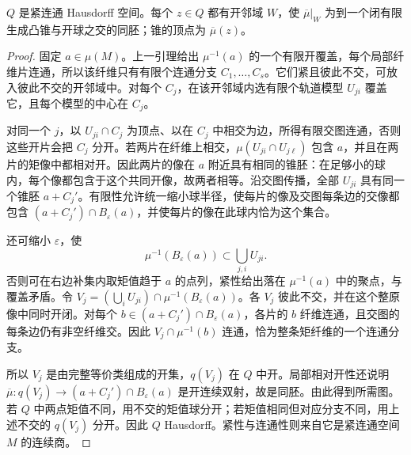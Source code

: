 \begin{lemma}\label{g4:lem:1202:fibre-component-quotient}
	\(Q\) 是紧连通 Hausdorff 空间。每个 \(z\in Q\) 都有开邻域 \(W\)，使 \(\overline\mu|_W\) 为到一个闭有限生成凸锥与开球之交的同胚；锥的顶点为 \(\overline\mu(z)\)。
\end{lemma}
\begin{proof}
	固定 \(a\in\mu(M)\)。上一引理给出 \(\mu^{-1}(a)\) 的一个有限开覆盖，每个局部纤维片连通，所以该纤维只有有限个连通分支 \(C_1,\ldots,C_s\)。它们紧且彼此不交，可放入彼此不交的开邻域中。对每个 \(C_j\)，在该开邻域内选有限个轨道模型 \(U_{ji}\) 覆盖它，且每个模型的中心在 \(C_j\)。

	对同一个 \(j\)，以 \(U_{ji}\cap C_j\) 为顶点、以在 \(C_j\) 中相交为边，所得有限交图连通，否则这些开片会把 \(C_j\) 分开。若两片在纤维上相交，\(\mu(U_{ji}\cap U_{j\ell})\) 包含 \(a\)，并且在两片的矩像中都相对开。因此两片的像在 \(a\) 附近具有相同的锥胚：在足够小的球内，每个像都包含于这个共同开像，故两者相等。沿交图传播，全部 \(U_{ji}\) 具有同一个锥胚 \(a+C_j'\)。有限性允许统一缩小球半径，使每片的像及交图每条边的交像都包含 \((a+C_j')\cap B_\varepsilon(a)\)，并使每片的像在此球内恰为这个集合。

	还可缩小 \(\varepsilon\)，使
	\[
		\mu^{-1}(B_\varepsilon(a))\subset\bigcup_{j,i}U_{ji}.
	\]
	否则可在右边补集内取矩值趋于 \(a\) 的点列，紧性给出落在 \(\mu^{-1}(a)\) 中的聚点，与覆盖矛盾。令 \(V_j=(\bigcup_iU_{ji})\cap\mu^{-1}(B_\varepsilon(a))\)。各 \(V_j\) 彼此不交，并在这个整原像中同时开闭。对每个 \(b\in(a+C_j')\cap B_\varepsilon(a)\)，各片的 \(b\) 纤维连通，且交图的每条边仍有非空纤维交。因此 \(V_j\cap\mu^{-1}(b)\) 连通，恰为整条矩纤维的一个连通分支。

	所以 \(V_j\) 是由完整等价类组成的开集，\(q(V_j)\) 在 \(Q\) 中开。局部相对开性还说明 \(\overline\mu:q(V_j)\to(a+C_j')\cap B_\varepsilon(a)\) 是开连续双射，故是同胚。由此得到所需图。若 \(Q\) 中两点矩值不同，用不交的矩值球分开；若矩值相同但对应分支不同，用上述不交的 \(q(V_j)\) 分开。因此 \(Q\) Hausdorff。紧性与连通性则来自它是紧连通空间 \(M\) 的连续商。
\end{proof}


